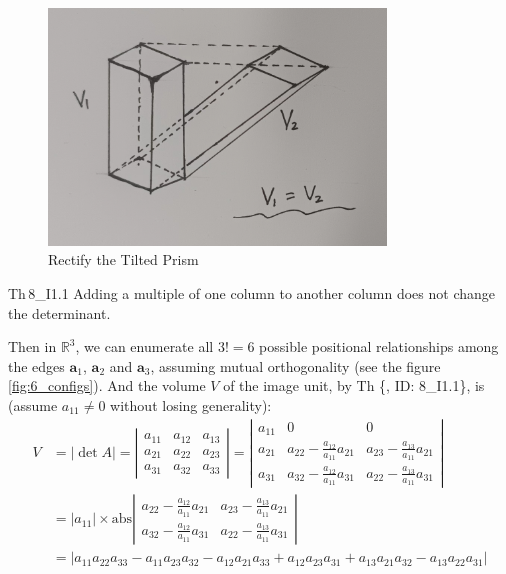 \documentclass{article}
\begin{document}
\begin{figure}[H]
    \centering
    \includegraphics[width=0.8\textwidth]{figs_I1/2.jpg}
    \caption{Rectify the Tilted Prism}
    \label{fig:rectify_prism}
\end{figure}

\begin{Th}{Th\,8\_I1.1}
    Adding a multiple of one column to another column does not change the determinant.
\end{Th}

Then in $\mathbb{R}^3$, we can enumerate all $3!=6$ possible positional relationships among the edges $\pmb{a}_1$, $\pmb{a}_2$ and $\pmb{a}_3$, assuming mutual orthogonality (see the figure \ref{fig:6_configs}). And the volume $V$ of the image unit, by Th \{, ID: 8\_I1.1\}, is (assume $a_{11}\neq 0$ without losing generality):
\begin{equation}
    \begin{aligned}
        V &= |\det A| = \left|\begin{array}{ccc}
        a_{11} & a_{12} & a_{13} \\
        a_{21} & a_{22} & a_{23} \\
        a_{31} & a_{32} & a_{33} 
    \end{array}\right| = \left|\begin{array}{ccc}
        a_{11} & 0 & 0 \\
        a_{21} & a_{22}-\frac{a_{12}}{a_{11}}a_{21} & a_{23}-\frac{a_{13}}{a_{11}}a_{21} \\
        a_{31} & a_{32}-\frac{a_{12}}{a_{11}}a_{31} & a_{22}-\frac{a_{13}}{a_{11}}a_{31} 
    \end{array}\right| \\
        &= |a_{11}|\times \text{abs} \left|\begin{array}{cc}
            a_{22}-\frac{a_{12}}{a_{11}}a_{21} & a_{23}-\frac{a_{13}}{a_{11}}a_{21} \\
            a_{32}-\frac{a_{12}}{a_{11}}a_{31} & a_{22}-\frac{a_{13}}{a_{11}}a_{31}
        \end{array}\right| \\
        &= | a_{11}a_{22}a_{33} - a_{11}a_{23}a_{32} - a_{12}a_{21}a_{33} + a_{12}a_{23}a_{31} + a_{13}a_{21}a_{32} - a_{13}a_{22}a_{31} |
    \end{aligned}
    \label{eq:abs_det_3}
\end{equation}
\end{document}
